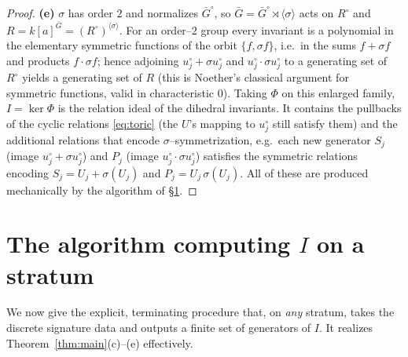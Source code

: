 \documentclass{amsart}
\theoremstyle{definition}
\begin{document}
\begin{proof}
\textbf{(e)} $\sigma$ has order $2$ and normalizes $\bar G^{\circ}$, so
$\bar G=\bar G^{\circ}\rtimes\langle\sigma\rangle$ acts on $R^{\circ}$ and
$R=k[a]^{\bar G}=(R^{\circ})^{\langle\sigma\rangle}$. For an order--$2$ group every
invariant is a polynomial in the elementary symmetric functions of the orbit
$\{f,\sigma f\}$, i.e.\ in the sums $f+\sigma f$ and products $f\cdot\sigma f$; hence
adjoining $u^{\circ}_j+\sigma u^{\circ}_j$ and $u^{\circ}_j\cdot\sigma u^{\circ}_j$
to a generating set of $R^{\circ}$ yields a generating set of $R$ (this is Noether's
classical argument for symmetric functions, valid in characteristic $0$). Taking
$\Phi$ on this enlarged family, $I=\ker\Phi$ is the relation ideal of the dihedral
invariants. It contains the pullbacks of the cyclic relations \eqref{eq:toric} (the
$U$'s mapping to $u^{\circ}_j$ still satisfy them) and the additional relations that
encode $\sigma$--symmetrization, e.g.\ each new generator $S_j$ (image
$u^{\circ}_j+\sigma u^{\circ}_j$) and $P_j$ (image
$u^{\circ}_j\cdot\sigma u^{\circ}_j$) satisfies the symmetric relations encoding
$S_j=U_j+\sigma(U_j)$ and $P_j=U_j\,\sigma(U_j)$. All of these are produced
mechanically by the algorithm of \S\ref{sec:algo}.
\end{proof}

\section{The algorithm computing $I$ on a stratum}\label{sec:algo}

We now give the explicit, terminating procedure that, on \emph{any} stratum,
takes the discrete signature data and outputs a finite set of generators of $I$.
It realizes Theorem~\ref{thm:main}(c)--(e) effectively.
\end{document}

